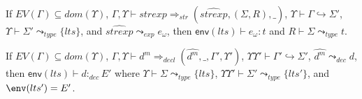 \begin{theorem}
If $EV(\Gamma)\subseteq dom(\Upsilon)$, 
$\Gamma,\Upsilon\vdash strexp \Rightarrow_{str}
(\widehat{strexp},(\Sigma,R),\_)$,
$\Upsilon\vdash\Gamma\hookrightarrow\Sigma'$, 
$\Upsilon\vdash \Sigma' \leadsto_{type} \{ lts \}$, and
$\widehat{strexp} \leadsto_{exp} e_{\omega}$, then
$\mathsf{env}(lts)\vdash e_\omega : t$ 
and $R\vdash\Sigma \leadsto_{type} t$. 

If $EV(\Gamma)\subseteq dom(\Upsilon)$, 
$\Gamma,\Upsilon\vdash d^m \Rightarrow_{decl} (\widehat{d^m}, \_, \Gamma',
\Upsilon')$, $\Upsilon\Upsilon'\vdash \Gamma' \hookrightarrow \Sigma'$,
$\widehat{d^m} \leadsto_{dec} d$, then $\mathsf{env}(lts) \vdash d :_{dec} E'$
where $\Upsilon\vdash \Sigma \leadsto_{type} \{lts\}$, $ \Upsilon\Upsilon'\vdash
\Sigma' \leadsto_{type} \{ lts' \}$, and $\env(lts')=E'$. 
\end{theorem}
